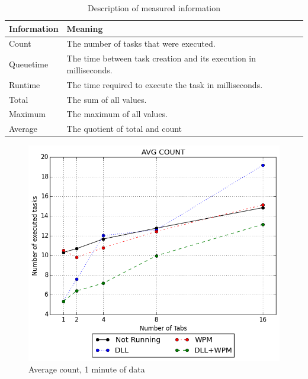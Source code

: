 \begin{table}
\begin{tabularx}{\textwidth}{|l|X|}
\hline
Information & Meaning \\ \hline
Count & The number of tasks that were executed. \\ \hline
Queuetime & The time between task creation and its execution in milliseconds. \\ \hline
Runtime & The time required to execute the task in milliseconds. \\ \hline
Total & The sum of all values. \\ \hline
Maximum & The maximum of all values. \\ \hline
Average & The quotient of total and count \\ \hline
\end{tabularx}
\caption{Description of measured information}
\label{fig:ex1_info}
\end{table}
\begin{figure}[!htbp]
	\centering
    \includegraphics[width=\textwidth,keepaspectratio]{Evaluation/experiment1/AVG-COUNT-1.png}
    \caption{Average count, 1 minute of data}
    \label{fig:ex1_avgcount_1}
\end{figure}
